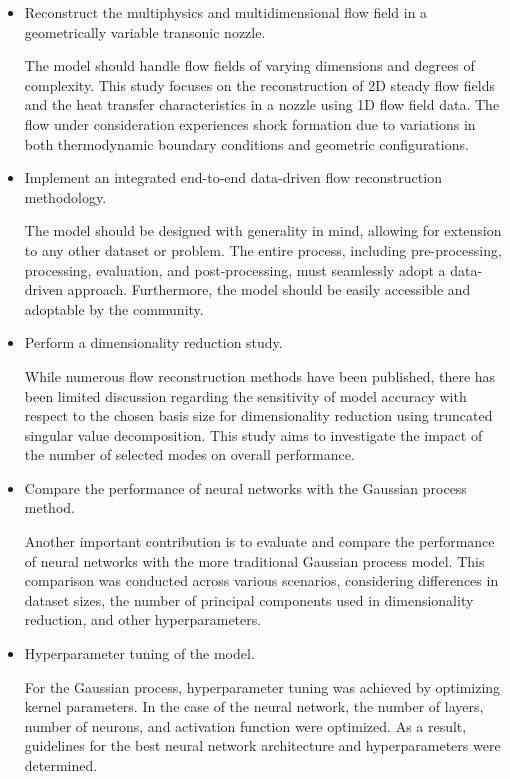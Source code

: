 \begin{itemize}
\item

Reconstruct the multiphysics and multidimensional flow field in a geometrically variable transonic nozzle.

The model should handle flow fields of varying dimensions and degrees of complexity. This study focuses on the reconstruction of 2D steady flow fields and the heat transfer characteristics in a nozzle using 1D flow field data. The flow under consideration experiences shock formation due to variations in both thermodynamic boundary conditions and geometric configurations.

\item 

Implement an integrated end-to-end data-driven flow reconstruction methodology.

The model should be designed with generality in mind, allowing for extension to any other dataset or problem. The entire process, including pre-processing, processing, evaluation, and post-processing, must seamlessly adopt a data-driven approach. Furthermore, the model should be easily accessible and adoptable by the community.

\item 

Perform a dimensionality reduction study.

While numerous flow reconstruction methods have been published, there has been limited discussion regarding the sensitivity of model accuracy with respect to the chosen basis size for dimensionality reduction using truncated singular value decomposition. This study aims to investigate the impact of the number of selected modes on overall performance.

\item
	Compare the performance of neural networks with the Gaussian process method.

	Another important contribution is to evaluate and compare the performance of neural networks with the more traditional Gaussian process model. This comparison was conducted across various scenarios, considering differences in dataset sizes, the number of principal components used in dimensionality reduction, and other hyperparameters.

	\item 
	
	Hyperparameter tuning of the model.

	For the Gaussian process, hyperparameter tuning was achieved by optimizing kernel parameters. In the case of the neural network, the number of layers, number of neurons, and activation function were optimized. As a result, guidelines for the best neural network architecture and hyperparameters were determined.

\end{itemize}


